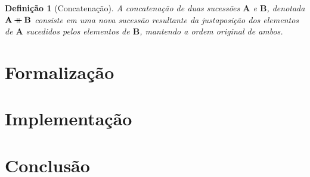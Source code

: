 \documentclass{report}
\newcommand\mdoubleplus{\mathbin{+\mkern-10mu+}}
\newtheorem{definition}{Definição}
\begin{document}
    \begin{definition}[Concatenação]
        A concatenação de duas sucessões $\mathbf{A}$ e $\mathbf{B}$, denotada $\mathbf{A} \mdoubleplus \mathbf{B}$ consiste em uma nova sucessão resultante da justaposição dos elementos de $\mathbf{A}$ sucedidos pelos elementos de $\mathbf{B}$, mantendo a ordem original de ambos.
    \end{definition}

    \chapter{Formalização}
    \chapter{Implementação}
    \chapter{Conclusão}

    
    
\end{document}

